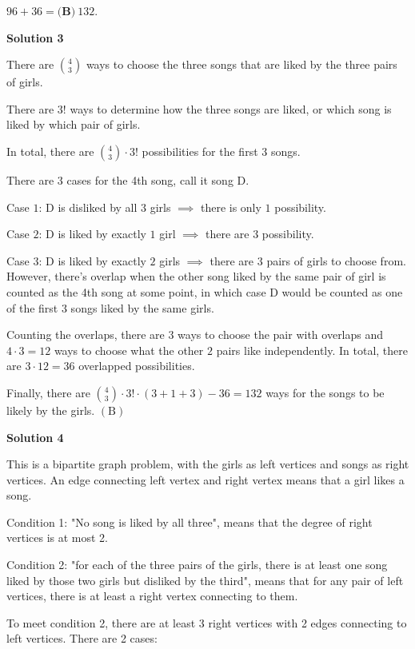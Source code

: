 \begin{enumerate}
 $96 + 36 = \boxed{\textbf{(B)} \: 132}$.

 



\textbf{Solution 3}

There are $\binom{4}{3}$ ways to choose the three songs that are liked by the three pairs of girls.

 There are $3!$ ways to determine how the three songs are liked, or which song is liked by which pair of girls.

 In total, there are $\binom{4}{3}\cdot3!$ possibilities for the first $3$ songs.

 There are $3$ cases for the 4th song, call it song D.

 Case $1$: D is disliked by all $3$ girls $\implies$ there is only $1$ possibility.

 Case $2$: D is liked by exactly $1$ girl $\implies$ there are $3$ possibility.

 Case $3$: D is liked by exactly $2$ girls $\implies$ there are $3$ pairs of girls to choose from. However, there's overlap when the other song liked by the same pair of girl is counted as the 4th song at some point, in which case D would be counted as one of the first $3$ songs liked by the same girls.

 Counting the overlaps, there are $3$ ways to choose the pair with overlaps and $4\cdot3=12$ ways to choose what the other $2$ pairs like independently. In total, there are $3\cdot12=36$ overlapped possibilities.

 Finally, there are $\binom{4}{3}\cdot3!\cdot(3+1+3)-36=132$ ways for the songs to be likely by the girls. $\boxed{\mathrm{(B)}}$




\textbf{Solution 4}

This is a bipartite graph problem, with the girls as left vertices and songs as right vertices. An edge connecting left vertex and right vertex means that a girl likes a song.

 Condition 1: "No song is liked by all three", means that the degree of right vertices is at most 2. 

 Condition 2: "for each of the three pairs of the girls, there is at least one song liked by those two girls but disliked by the third", means that for any pair of left vertices, there is at least a right vertex connecting to them.

 To meet condition 2, there are at least 3 right vertices with 2 edges connecting to left vertices.  There are 2 cases:


\end{enumerate}
